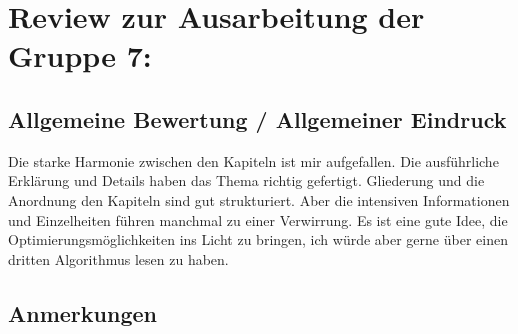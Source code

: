 \documentclass[a4paper,12pt]{book}
\begin{document}
\chapter*{Review zur Ausarbeitung der Gruppe 7:}

\section*{Allgemeine Bewertung / Allgemeiner Eindruck}
Die starke Harmonie zwischen den Kapiteln ist mir aufgefallen. Die ausführliche Erklärung und Details haben das Thema richtig gefertigt.
Gliederung und die Anordnung den Kapiteln sind gut strukturiert. Aber die intensiven Informationen und Einzelheiten führen manchmal zu einer Verwirrung.
Es ist eine gute Idee, die Optimierungsmöglichkeiten ins Licht zu bringen, ich würde aber gerne über einen dritten Algorithmus lesen zu haben. 

\section*{Anmerkungen}
\end{document}
